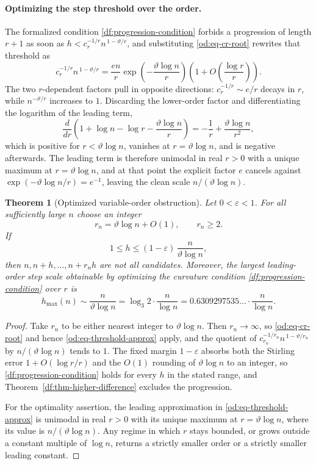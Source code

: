 \documentclass[11pt,oneside]{article}
\newtheorem{theorem}{Theorem}[section]
\theoremstyle{definition}
\theoremstyle{remark}
\newcommand{\thetaq}{\vartheta}
\begin{document}
\paragraph{Optimizing the step threshold over the order.}
The formalized condition \eqref{df:progression-condition} forbids a progression of length
$r+1$ as soon as $h<c_r^{-1/r}n^{\,1-\thetaq/r}$, and substituting \eqref{od:eq-cr-root}
rewrites that threshold as
\begin{equation}
 c_r^{-1/r}n^{\,1-\thetaq/r}
 =\frac{en}{r}\exp\!\left(-\frac{\thetaq\log n}{r}\right)
  \left(1+O\!\left(\frac{\log r}{r}\right)\right).
 \label{od:eq-threshold-approx}
\end{equation}
The two $r$-dependent factors pull in opposite directions: $c_r^{-1/r}\sim e/r$ decays in
$r$, while $n^{-\thetaq/r}$ increases to $1$.  Discarding the lower-order factor and
differentiating the logarithm of the leading term,
\[
 \frac{d}{dr}\left(1+\log n-\log r-\frac{\thetaq\log n}{r}\right)
 =-\frac1r+\frac{\thetaq\log n}{r^{2}},
\]
which is positive for $r<\thetaq\log n$, vanishes at $r=\thetaq\log n$, and is negative
afterwards.  The leading term is therefore unimodal in real $r>0$ with a unique maximum at
$r=\thetaq\log n$, and at that point the explicit factor $e$ cancels against
$\exp(-\thetaq\log n/r)=e^{-1}$, leaving the clean scale $n/(\thetaq\log n)$.

\begin{theorem}[Optimized variable-order obstruction]
\label{od:thm-optimized}
Let $0<\varepsilon<1$.  For all sufficiently large $n$ choose an integer
\[
 r_n=\thetaq\log n+O(1),\qquad r_n\ge2 .
\]
If
\[
 1\le h\le(1-\varepsilon)\,\frac{n}{\thetaq\log n},
\]
then $n,n+h,\dots,n+r_nh$ are not all candidates.  Moreover, the largest leading-order step
scale obtainable by optimizing the curvature condition \eqref{df:progression-condition} over
$r$ is
\[
 h_{\max}(n)\sim\frac{n}{\thetaq\log n}
 =\log_3 2\cdot\frac{n}{\log n}
 =0.6309297535\ldots\cdot\frac{n}{\log n}.
\]
\end{theorem}

\begin{proof}
Take $r_n$ to be either nearest integer to $\thetaq\log n$.  Then $r_n\to\infty$, so
\eqref{od:eq-cr-root} and hence \eqref{od:eq-threshold-approx} apply, and the quotient of
$c_{r_n}^{-1/r_n}n^{\,1-\thetaq/r_n}$ by $n/(\thetaq\log n)$ tends to $1$.  The fixed margin
$1-\varepsilon$ absorbs both the Stirling error $1+O(\log r/r)$ and the $O(1)$ rounding of
$\thetaq\log n$ to an integer, so \eqref{df:progression-condition} holds for every $h$ in the
stated range, and Theorem~\ref{df:thm-higher-difference} excludes the progression.

For the optimality assertion, the leading approximation in \eqref{od:eq-threshold-approx} is
unimodal in real $r>0$ with its unique maximum at $r=\thetaq\log n$, where its value is
$n/(\thetaq\log n)$.  Any regime in which $r$ stays bounded, or grows outside a constant
multiple of $\log n$, returns a strictly smaller order or a strictly smaller leading constant.
\end{proof}
\end{document}
